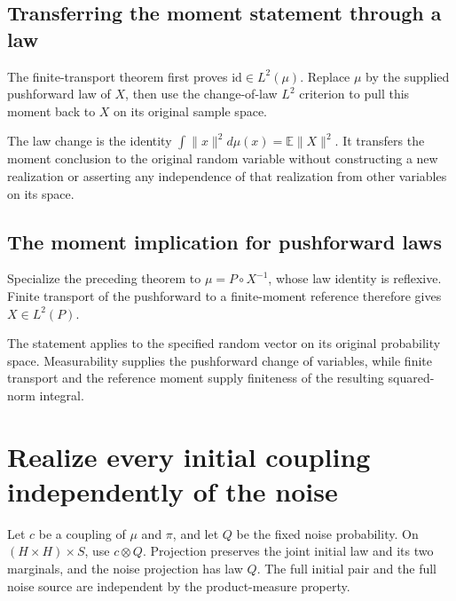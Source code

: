 \documentclass[11pt,a4paper]{report}
\begin{document}
\subsection{\texorpdfstring{Transferring the moment statement through a law}{Transferring the moment statement through a law}}
\label{report-step-UnadjustedLangevin-TransportMoments-lean-3}


The finite-transport theorem first proves \(\mathrm{id}\in L^2(\mu)\). Replace \(\mu\) by the supplied pushforward law of \(X\), then use the change-of-law \(L^2\) criterion to pull this moment back to \(X\) on its original sample space.



The law change is the identity \(\int\|x\|^2d\mu(x)=\mathbb E\|X\|^2\). It transfers the moment conclusion to the original random variable without constructing a new realization or asserting any independence of that realization from other variables on its space.

\subsection{\texorpdfstring{The moment implication for pushforward laws}{The moment implication for pushforward laws}}
\label{report-step-UnadjustedLangevin-TransportMoments-lean-4}


Specialize the preceding theorem to \(\mu=P\circ X^{-1}\), whose law identity is reflexive. Finite transport of the pushforward to a finite-moment reference therefore gives \(X\in L^2(P)\).



The statement applies to the specified random vector on its original probability space. Measurability supplies the pushforward change of variables, while finite transport and the reference moment supply finiteness of the resulting squared-norm integral.

\section{\texorpdfstring{Realize every initial coupling independently of the noise}{Realize every initial coupling independently of the noise}}
\label{proof-module-UnadjustedLangevin-InitialExtension-lean}


Let \(c\) be a coupling of \(\mu\) and \(\pi\), and let \(Q\) be the fixed noise probability. On \((H\times H)\times S\), use \(c\otimes Q\). Projection preserves the joint initial law and its two marginals, and the noise projection has law \(Q\). The full initial pair and the full noise source are independent by the product-measure property.
\end{document}
